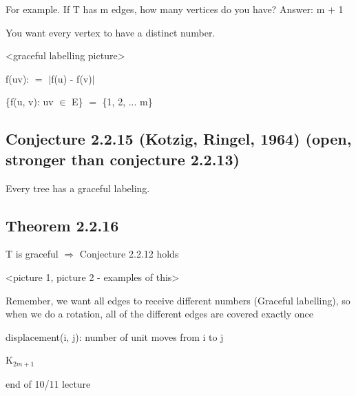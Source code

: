 \documentclass{article}
\newcommand{\mt}[1]{\ensuremath{#1}}
\newcommand\ssc[2][\DefaultOpt]{%
  \def\DefaultOpt{#2}%
  \subsection[#1]{#2}%
}
\newcommand{\mem}{\mt{\in} }
\newcommand{\rar}{ \mt{\Rightarrow} }     %
\newcommand{\av}[1]{\mt{|}#1\mt{|}}  %
\newcommand{\bk}[1]{\{#1\}}
\newcommand{\ps}{\mt{\operatorname{+}} }
\newcommand{\ms}{\mt{\operatorname{-}} }
\newcommand{\eql}{ \mt{\operatorname{=}} }
\newcommand{\uw}[2]{#1\mt{_{#2}}}
\begin{document}
{For example. If T has m edges, how many vertices do you have? Answer: m \ps 1

You want every vertex to have a distinct number.

<graceful labelling picture>

f(uv): \eql \av{f(u) \ms f(v)}

\bk{f(u, v): uv \mem E} \eql \bk{1, 2, ... m}

\ssc{Conjecture 2.2.15 (Kotzig, Ringel, 1964) (open, stronger than conjecture 2.2.13)}{

Every tree has a graceful labeling. 

}

\ssc{Theorem 2.2.16}{
T is graceful \rar Conjecture 2.2.12 holds

<picture 1, picture 2 - examples of this>

Remember, we want all edges to receive different numbers (Graceful labelling), so when we do a rotation, all of the different edges are covered exactly once

displacement(i, j): number of unit moves from i to j

\uw{K}{2m + 1} 
}

end of 10/11 lecture
}
\end{document}
